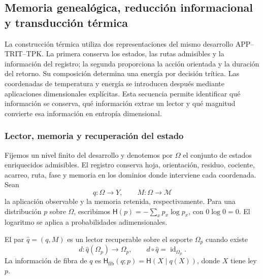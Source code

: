 
\subsection{Memoria genealógica, reducción informacional y transducción térmica}
\label{sec:ii-kb-aut-desarrollo}

La construcción térmica utiliza dos representaciones del mismo desarrollo
APP--TRIT--TPK. La primera conserva los estados, las rutas admisibles y
la información del registro; la segunda proporciona la acción orientada
y la duración del retorno. Su composición determina una energía por
decisión trítica. Las coordenadas de temperatura y energía se introducen
después mediante aplicaciones dimensionales explícitas. Esta secuencia
permite identificar qué información se conserva, qué información extrae
un lector y qué magnitud convierte esa información en entropía dimensional.

\subsubsection{Lector, memoria y recuperación del estado}

Fijemos un nivel finito del desarrollo y denotemos por \(\Omega\) el
conjunto de estados enriquecidos admisibles. El registro conserva hoja,
orientación, residuo, cociente, acarreo, ruta, fase y memoria en los
dominios donde interviene cada coordenada. Sean
\[
 q:\Omega\longrightarrow Y,\qquad
 M:\Omega\longrightarrow\mathcal M
\]
la aplicación observable y la memoria retenida, respectivamente. Para una
distribución \(p\) sobre \(\Omega\), escribimos
\(\mathsf H(p)=-\sum_xp_x\log p_x\), con \(0\log0=0\).
El logaritmo se aplica a probabilidades adimensionales.

\begin{definition}
El par \(\widehat q=(q,M)\) es un lector recuperable sobre el soporte
\(\Omega_p\) cuando existe
\[
 d:\widehat q(\Omega_p)\longrightarrow\Omega_p,
 \qquad d\circ\widehat q=\operatorname{id}_{\Omega_p}.
\]
La información de fibra de \(q\) es
\(\mathsf H_{\mathrm{fib}}(q;p)=\mathsf H(X\mid q(X))\), donde
\(X\) tiene ley \(p\).
\end{definition}

